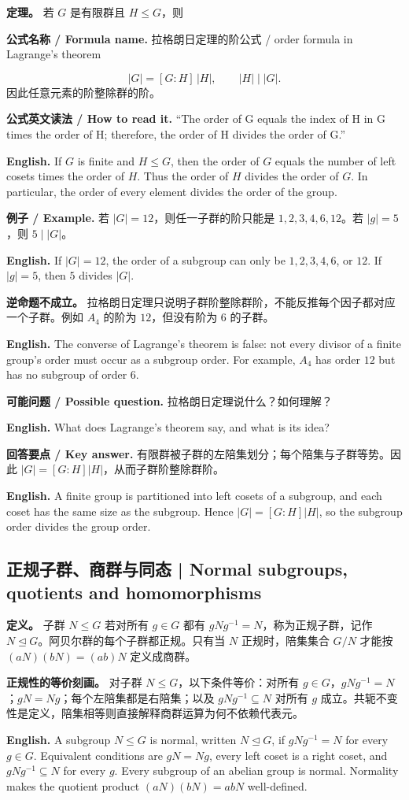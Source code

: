 \documentclass[UTF8,11pt,a4paper]{ctexart}
\newcommand{\EN}[1]{\par\noindent\textbf{English.} #1\par}
\newcommand{\READ}[1]{\par\noindent\textbf{公式英文读法 / How to read it.} #1\par}
\newcommand{\FORMULA}[2]{\par\noindent\textbf{公式名称 / Formula name.} #1 / #2\par}
\newcommand{\EX}[2]{\par\noindent\textbf{例子 / Example.} #1\par\EN{#2}}
\newcommand{\ASK}[4]{\par\noindent\textbf{可能问题 / Possible question.} #1\par\EN{#2}\noindent\textbf{回答要点 / Key answer.} #3\par\EN{#4}\medskip}
\begin{document}
\noindent\textbf{定理。} 若 $G$ 是有限群且 $H\le G$，则
\FORMULA{拉格朗日定理的阶公式}{order formula in Lagrange's theorem}
\[
|G|=[G:H]\,|H|,\qquad |H|\mid |G|.
\]
因此任意元素的阶整除群的阶。
\READ{“The order of G equals the index of H in G times the order of H; therefore, the order of H divides the order of G.”}
\EN{If $G$ is finite and $H\le G$, then the order of $G$ equals the number of left cosets times the order of $H$. Thus the order of $H$ divides the order of $G$. In particular, the order of every element divides the order of the group.}

\EX{若 $|G|=12$，则任一子群的阶只能是 $1,2,3,4,6,12$。若 $|g|=5$，则 $5\mid |G|$。}{If $|G|=12$, the order of a subgroup can only be $1,2,3,4,6$, or $12$. If $|g|=5$, then $5$ divides $|G|$.}

\noindent\textbf{逆命题不成立。} 拉格朗日定理只说明子群阶整除群阶，不能反推每个因子都对应一个子群。例如 $A_4$ 的阶为 $12$，但没有阶为 $6$ 的子群。
\EN{The converse of Lagrange's theorem is false: not every divisor of a finite group's order must occur as a subgroup order. For example, $A_4$ has order $12$ but has no subgroup of order $6$.}

\ASK{拉格朗日定理说什么？如何理解？}{What does Lagrange's theorem say, and what is its idea?}{有限群被子群的左陪集划分；每个陪集与子群等势。因此 $|G|=[G:H]|H|$，从而子群阶整除群阶。}{A finite group is partitioned into left cosets of a subgroup, and each coset has the same size as the subgroup. Hence $|G|=[G:H]|H|$, so the subgroup order divides the group order.}

\subsection{正规子群、商群与同态 | Normal subgroups, quotients and homomorphisms}
\noindent\textbf{定义。} 子群 $N\le G$ 若对所有 $g\in G$ 都有 $gNg^{-1}=N$，称为正规子群，记作 $N\trianglelefteq G$。阿贝尔群的每个子群都正规。只有当 $N$ 正规时，陪集集合 $G/N$ 才能按 $(aN)(bN)=(ab)N$ 定义成商群。

\noindent\textbf{正规性的等价刻画。} 对子群 $N\le G$，以下条件等价：对所有 $g\in G$，$gNg^{-1}=N$；$gN=Ng$；每个左陪集都是右陪集；以及 $gNg^{-1}\subseteq N$ 对所有 $g$ 成立。共轭不变性是定义，陪集相等则直接解释商群运算为何不依赖代表元。

\EN{A subgroup $N\le G$ is normal, written $N\trianglelefteq G$, if $gNg^{-1}=N$ for every $g\in G$. Equivalent conditions are $gN=Ng$, every left coset is a right coset, and $gNg^{-1}\subseteq N$ for every $g$. Every subgroup of an abelian group is normal. Normality makes the quotient product $(aN)(bN)=abN$ well-defined.}
\end{document}
